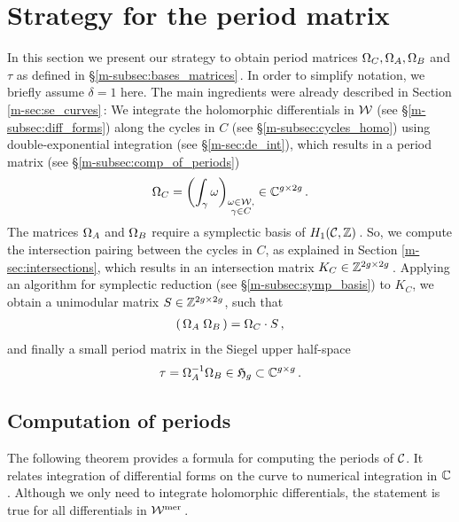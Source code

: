 \documentclass[main.tex]{subfiles}
\begin{document}
  \section{Strategy for the period matrix}

  In this section we present our strategy to obtain period matrices $\Omega_C, \Omega_A, \Omega_B$ and $\tau$ as defined in \S \ref{m-subsec:bases_matrices}\,. In order to simplify notation, 
  we briefly assume $\delta = 1$ here. The main ingredients were already described in
  Section \ref{m-sec:se_curves}\,: \abstand We integrate the holomorphic differentials in $\mathcal{W}$ (see \S \ref{m-subsec:diff_forms})
  along the cycles in $C$ (see  \S \ref{m-subsec:cycles_homo}) using double-exponential integration (see \S \ref{m-sec:de_int}), which results in a period matrix (see \S \ref{m-subsec:comp_of_periods})
  \begin{align}
    \Omega_C = \left( \int_{\gamma} \omega \right)_{\substack{\omega \in \mathcal{W}, \\ \gamma \in C}} \in \mathbb{C}^{g \times 2g}\,.
  \end{align}
  The matrices $\Omega_A$ and $\Omega_B$ require a symplectic basis of $H_1(\mathcal{C},\mathbb{Z})$\,.
  So, we compute the intersection pairing between the cycles in $C$, as explained in Section \ref{m-sec:intersections}, which results in an
  intersection matrix $K_C \in \mathbb{Z}^{2g \times 2g}$\,. \abstand
  Applying an algorithm for symplectic reduction (see \S \ref{m-subsec:symp_basis}) to $K_C$, we obtain a unimodular matrix $S \in \mathbb{Z}^{2g \times 2g}$, such that
  \begin{align}
   ( \, \Omega_A \; \Omega_B \, ) = \Omega_C \cdot S\,,
   \end{align}
   and finally a small period matrix in the Siegel upper half-space
   \begin{align}
   \tau = \Omega_A^{-1} \Omega_B \in \mathfrak{H}_g \subset \mathbb{C}^{g \times g}\,.
  \end{align}
  
  \bigskip
  
  \subsection{Computation of periods}\label{subsec:comp_of_periods}
  
  The following theorem provides a formula for computing the periods of $\mathcal{C}$. It relates integration of differential forms on the curve to numerical integration in $\mathbb{C}$.
  Although we only need to integrate holomorphic
  differentials, the statement is true for all differentials in $\mathcal{W}^{\text{mer}}$\,.
  
\end{document}
